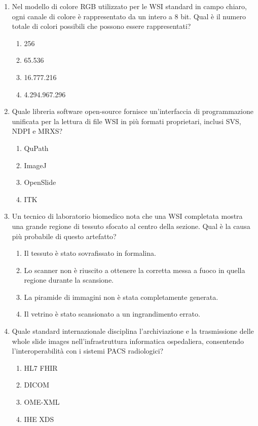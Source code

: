\begin{enumerate}
  \item \label{ch1:q4} Nel modello di colore RGB utilizzato per le WSI standard in campo chiaro, ogni canale di colore è rappresentato da un intero a 8 bit. Qual è il numero totale di colori possibili che possono essere rappresentati?
  \begin{enumerate}[label=\Alph*.]
    \item 256
    \item 65.536
    \item 16.777.216
    \item 4.294.967.296
  \end{enumerate}

  \item \label{ch1:q5} Quale libreria software open-source fornisce un'interfaccia di programmazione unificata per la lettura di file WSI in più formati proprietari, inclusi SVS, NDPI e MRXS?
  \begin{enumerate}[label=\Alph*.]
    \item QuPath
    \item ImageJ
    \item OpenSlide
    \item ITK
  \end{enumerate}

  \item \label{ch1:q6} Un tecnico di laboratorio biomedico nota che una WSI completata mostra una grande regione di tessuto sfocato al centro della sezione. Qual è la causa più probabile di questo artefatto?
  \begin{enumerate}[label=\Alph*.]
    \item Il tessuto è stato sovrafissato in formalina.
    \item Lo scanner non è riuscito a ottenere la corretta messa a fuoco in quella regione durante la scansione.
    \item La piramide di immagini non è stata completamente generata.
    \item Il vetrino è stato scansionato a un ingrandimento errato.
  \end{enumerate}

  \item \label{ch1:q7} Quale standard internazionale disciplina l'archiviazione e la trasmissione delle whole slide images nell'infrastruttura informatica ospedaliera, consentendo l'interoperabilità con i sistemi PACS radiologici?
  \begin{enumerate}[label=\Alph*.]
    \item HL7 FHIR
    \item DICOM
    \item OME-XML
    \item IHE XDS
  \end{enumerate}


\end{enumerate}
